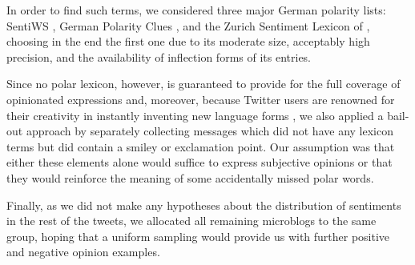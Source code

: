 In order to find such terms, we considered three major German polarity
lists: SentiWS \cite{Remus:10}, German Polarity Clues
\cite{Waltinger:10}, and the Zurich Sentiment Lexicon of
\citet{Clematide:10}, choosing in the end the first one due to its
moderate size, acceptably high precision, and the availability of
inflection forms of its entries.

Since no polar lexicon, however, is guaranteed to provide for the full
coverage of opinionated expressions and, moreover, because Twitter
users are renowned for their creativity in instantly inventing new
language forms \cite{Eisenstein:13}, we also applied a bail-out
approach by separately collecting messages which did not have any
lexicon terms but did contain a smiley or exclamation point.  Our
assumption was that either these elements alone would suffice to
express subjective opinions or that they would reinforce the meaning
of some accidentally missed polar words.

Finally, as we did not make any hypotheses about the distribution of
sentiments in the rest of the tweets, we allocated all remaining
microblogs to the same group, hoping that a uniform sampling would
provide us with further positive and negative opinion examples.

